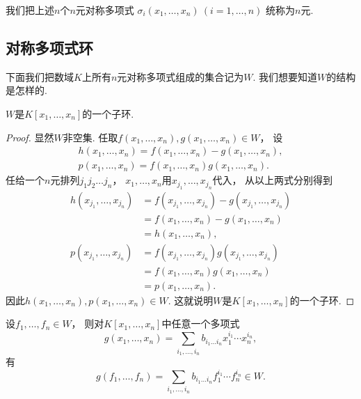 我们把上述\(n\)个\(n\)元对称多项式
\(\sigma_i(x_1,\dotsc,x_n)\ (i=1,\dotsc,n)\)
统称为\(n\)元.

\subsection{对称多项式环}
下面我们把数域\(K\)上所有\(n\)元对称多项式组成的集合记为\(W\).
我们想要知道\(W\)的结构是怎样的.

\begin{proposition}
\(W\)是\(K[x_1,\dotsc,x_n]\)的一个子环.
\begin{proof}
显然\(W\)非空集.
任取\(f(x_1,\dotsc,x_n),g(x_1,\dotsc,x_n) \in W\)，
设\begin{gather*}
	h(x_1,\dotsc,x_n)
	=f(x_1,\dotsc,x_n)
	-g(x_1,\dotsc,x_n), \\
	p(x_1,\dotsc,x_n)
	=f(x_1,\dotsc,x_n)
	g(x_1,\dotsc,x_n).
\end{gather*}
任给一个\(n\)元排列\(j_1 j_2 \dotso j_n\)，
\(x_1,\dotsc,x_n\)用\(x_{j_1},\dotsc,x_{j_n}\)代入，
从以上两式分别得到\begin{align*}
	h(x_{j_1},\dotsc,x_{j_n})
	&=f(x_{j_1},\dotsc,x_{j_n})
	-g(x_{j_1},\dotsc,x_{j_n}) \\
	&=f(x_1,\dotsc,x_n)
	-g(x_1,\dotsc,x_n) \\
	&=h(x_1,\dotsc,x_n), \\
	p(x_{j_1},\dotsc,x_{j_n})
	&=f(x_{j_1},\dotsc,x_{j_n})
	g(x_{j_1},\dotsc,x_{j_n}) \\
	&=f(x_1,\dotsc,x_n)
	g(x_1,\dotsc,x_n) \\
	&=p(x_1,\dotsc,x_n).
\end{align*}
因此\(h(x_1,\dotsc,x_n),p(x_1,\dotsc,x_n) \in W\).
这就说明\(W\)是\(K[x_1,\dotsc,x_n]\)的一个子环.
\end{proof}
\end{proposition}

\begin{proposition}
设\(f_1,\dotsc,f_n \in W\)，
则对\(K[x_1,\dotsc,x_n]\)中任意一个多项式\[
	g(x_1,\dotsc,x_n)
	=\sum_{i_1,\dotsc,i_n}
	b_{i_1 \dotso i_n}
	x_1^{i_1} \dotsm x_n^{i_n},
\]
有\[
	g(f_1,\dotsc,f_n)
	=\sum_{i_1,\dotsc,i_n}
	b_{i_1 \dotso i_n}
	f_1^{i_1} \dotsm f_n^{i_n}
	\in W.
\]
\end{proposition}

